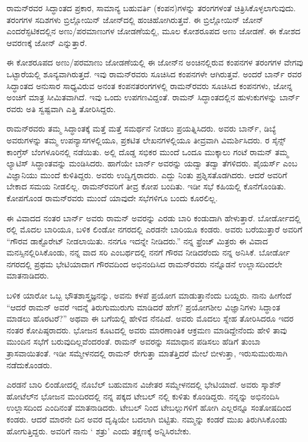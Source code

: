 ರಾಮನ್‍ರವರ ಸಿದ್ಧಾಂತದ ಪ್ರಕಾರ, ಸಾಮಾನ್ಯ ಬಹುವರ್ತಿ (ಕಂಪನ)ಗಳನ್ನು ತರಂಗ\-ಗಳಂತೆ ಚಿತ್ರಿಸಿಕೊಳ್ಳಲಾಗುವುದು. ತರಂಗಗಳ ಸದಿಶಗಳು ಬ್ರಿಲ್ಲೋಯಿನ್ ಜೋನ್‍ದಲ್ಲಿ ಹಂಚಿಹೋಗಿರುತ್ತವೆ. ಈ ಬ್ರಿಲ್ಲೋಯಿನ್ ಜೋನ್ ಎಂದರೆ\enginline{-}ಸ್ಫಟಿಕದಲ್ಲಿನ ಅಣು/ಪರಮಾಣುಗಳ ಜೋಡಣೆಯಲ್ಲಿ, ಮೂಲ ಕೋಶರೂಪದ ಅಣು ಜೋಡಣೆ. ಈ ಕೋಶದ ಆವರಣಕ್ಕೆ ಜೋನ್ ಎನ್ನುತ್ತಾರೆ.

ಈ ಕೋಶರೂಪದ ಅಣು/ಪರಮಾಣು ಜೋಡಣೆಯಲ್ಲಿ ಈ ಜೋನ್‌ನ ಅಂಚಿನಲ್ಲಿರುವ ಕಂಪನಗಳ ತರಂಗಗಳ ವೇಗವು ಒಟ್ಟಾರೆಯಲ್ಲಿ ಶೂನ್ಯವಾಗಿರುತ್ತದೆ. ಇವು ರಾಮನ್‍ರವರು ಸೂಚಿಸಿದ ಕಂಪನಗಳೇ ಆಗಿರುತ್ತವೆ. ಅಂದರೆ ಬಾರ್ನ್ ರವರ ಸಿದ್ಧಾಂತದ ಅನುಸಾರ ಸಾಧ್ಯವಿರುವ ಅನಂತ ಕಂಪನ\enginline{-}ತರಂಗಗಳಲ್ಲಿ ರಾಮನ್‍ರವರು ಸೂಚಿಸಿದ ಕಂಪನಗಳು, ಜೋನ್ನ ಅಂಚಿಗೆ ಮಾತ್ರ ಸೀಮಿತವಾಗಿದೆ. ಇವು ಒಂದು ಉಪಗಣವಿದ್ದಂತೆ. ರಾಮನ್ ಸಿದ್ಧಾಂತದಲ್ಲಿನ ಹುಳುಕುಗಳನ್ನು ಬಾರ್ನ್ ರವರು ಅತಿ ಸ್ವಷ್ಟವಾಗಿ ಎತ್ತಿ ತೋರಿಸಿದ್ದರು.

ರಾಮನ್‍ರವರು ತಮ್ಮ ಸಿದ್ಧಾಂತಕ್ಕೆ ಮತ್ತೆ ಮತ್ತೆ ಸಮರ್ಥನೆ ನೀಡಲು ಪ್ರಯತ್ನಿಸಿದರು. ಅವರು ಬಾರ್ನ್, ಡಿಬ್ಯೆ ಅವರುಗಳನ್ನು ತಮ್ಮ ಉಪನ್ಯಾಸಗಳಲ್ಲಿಯೂ, ಪ್ರಕಟಿತ ಲೇಖನಗಳಲ್ಲಿಯೂ ತೀವ್ರವಾಗಿ ವಿಮರ್ಶಿಸಿದರು. ರ ಸೈನ್ಸ್ ಕಾಂಗ್ರೆಸ್ ಬೆಂಗಳೂರಿನಲ್ಲಿ ನಡೆಯಿತು. ಅಲ್ಲಿ ದೊಡ್ಡ ಸಭಿಕರ ಮುಂದೆ ಒಂದೂ ಮುಕ್ಕಾಲು ಗಂಟೆ ರಾಮನ್ ತಮ್ಮ ಲ್ಯಾಟಿಸ್ ಸಿದ್ಧಾಂತವನ್ನು ಮಂಡಿಸಿದರು. ಹಾಗೆಯೇ ಬಾರ್ನ್ ಅವರನ್ನು ಯದ್ವಾ ತದ್ವಾ ತೆಗಳಿದರು. ಪೈಯರ್ಸ್ ಎಂಬ ವಿಜ್ಞಾನಿಯು ಮುಂದೆ ಕುಳಿತಿದ್ದರು. ಅವರು ಉದ್ವಿಗ್ನರಾದರು. ಎದ್ದು ನಿಂತು ಪ್ರಶ್ನಿಸತೊಡಗಿದರು. ಆದರೆ ಅವರಿಗೆ ಬೇಕಾದ ಸಮಯ ನೀಡಲಿಲ್ಲ. ರಾಮನ್‍ರವರಿಗೆ ತೀವ್ರ ಕೋಪ ಬಂದಿತು. ಇಡೀ ಸಭೆ ಕಹಿಯಲ್ಲಿ ಕೊನೆಗೊಂಡಿತು. ಕೋಪಗೊಂಡ ರಾಮನ್‍ರವರು ಮುಂದೆ ಯಾವುದೇ ಸಭೆಗಳಿಗೂ ಬಂದು ಕೂರಲಿಲ್ಲ.

ಈ ವಿವಾದದ ನಂತರ ಬಾರ್ನ್ ಅವರು ರಾಮನ್ ಅವರನ್ನು ಎರಡು ಬಾರಿ ಕಂಡುದಾಗಿ ಹೇಳುತ್ತಾರೆ. ಬೋರ್ಡೋದಲ್ಲಿ ರಲ್ಲಿ ಮೊದಲ ಬಾರಿಯೂ, ಬಳಿಕ ಲಿಂಡೋ ನಗರದಲ್ಲಿ ಎರಡನೇ ಬಾರಿಯೂ ಕಂಡರು. ಅವರು ಬರೆಯುತ್ತಾರೆ\enginline{--} ಅವರಿಗೆ “ಗೌರವ ಡಾಕ್ಟೊರೇಟ್ ನೀಡಲಾಯಿತು. ನನಗೂ ಇದನ್ನೇ ನೀಡಿದರು.” ನನ್ನ ಫ್ರೆಂಚ್ ಮಿತ್ರರು ಈ ವಿವಾದ ಮನಸ್ಸಿನಲ್ಲಿರಿಸಿಕೊಂಡು, ನನ್ನ ವಾದ ಸರಿ ಎಂಬರ್ಥದಲ್ಲಿ ನನಗೆ ಗೌರವ ನೀಡಿದರೆಂದು ನನ್ನ ಅನಿಸಿಕೆ. ಬೋರ್ಡೋ ನಗರದಲ್ಲಿ ಪ್ರಥಮ ಭೇಟಿಯಾದಾಗ ಗೌರವದಿಂದ ಅಭಿನಂದಿಸಿದ ರಾಮನ್‍ರವರು ನನ್ನೊಡನೆ ಉಲ್ಲಾಸದಿಂದಲೇ ಮಾತನಾಡಿದರು.

\newpage

ಬಳಿಕ ಯಾರೋ ಒಬ್ಬ ಭೌತಶಾಸ್ತ್ರಜ್ಞನನ್ನು, ಅವನು ಕಳಪೆ ಪ್ರಯೋಗ ಮಾಡುತ್ತಾನೆಂದು ಬಯ್ದರು. ನಾನು ಹೀಗೆಂದೆ \enginline{--} “ಆದರೆ ರಾಮನ್ ಅವರೆ ಇದನ್ನೆ ತಿರುಗುಮುರುಗು ಮಾಡಿದರೆ ಹೇಗೆ? ಪ್ರಯೋಗಶೀಲ ವಿಜ್ಞಾನಿಗಳು ಸಿದ್ಧಾಂತ ಮಾಡಲು ಹೊರಟರೆ?” ಅಥವಾ ಈ ಬಗೆಯಲ್ಲಿ ಹೇಳಿದ ನೆನಪಿದೆ. ಅವರು ಮೊದಲು ಸ್ನೇಹ ತೋರಿಸಿದರೂ ಇದರ ನಂತರ ಕೋಪಿಷ್ಠರಾದರು. ಭೋಜನ ಕೂಟದಲ್ಲಿ ಅವರು ಮಾರಣಾಂತಿಕ ಆಕ್ರಮಣ ಮಾಡಿದ್ದೇನೆಂದು ಹೇಳಿ ತಾವು ಮುಂದಿನ ಸಭೆಗೆ ಬರುವುದಿಲ್ಲವೆಂದರಂತೆ. ರಾಮನ್ ಅವರನ್ನು ಸಮಾಧಾನ ಪಡಿಸಲು ಹೆಡಿಗೆ ತುಂಬಾ ತ್ರಾಸವಾಯಿತಂತೆ. ಇಡೀ ಸಮ್ಮೇಳನದಲ್ಲಿ ರಾಮನ್ ರೇಗುತ್ತಾ ಮಾತೆತ್ತಿದರೆ ಮೇಲೆ ಬೀಳುತ್ತಾ, ಇರುಸುಮುರುಸಾಗಿ ನಡೆದುಕೊಂಡರು.

ಎರಡನೆ ಬಾರಿ ಲಿಂಡೋದಲ್ಲಿ ನೊಬೆಲ್ ಬಹುಮಾನ ವಿಜೇತರ ಸಮ್ಮೇಳನದಲ್ಲಿ ಭೇಟಿಯಾದೆ. ಅವರು ಸ್ಕಾಶೆನ್ ಹೋಟೆಲ್‍ನ ಭೋಜನ ಮಂದಿರದಲ್ಲಿ ನನ್ನ ಪಕ್ಕದ ಟೇಬಲ್ ನಲ್ಲಿ ಕುಳಿತು ಕೊಂಡಿದ್ದರು. ನನ್ನನ್ನು ಅಭಿನಂದಿಸಿ ಉಲ್ಲಾಸದಿಂದ ಎಂದಿನಂತೆ ಮಾತನಾಡಿದರು. ಟೇಬಲ್ ನಿಂದ ಟೇಬಲ್ಲುಗಳಿಗೆ ಹೋಗಿ ಎಲ್ಲರನ್ನೂ ಸಂತೋಷದಿಂದ ಕಂಡರು. ಆದರೆ ಮಾರನೇ ದಿನ ಅವರ ದೃಷ್ಠಿಯೇ ಬದಲಾಗಿ ಬಿಟ್ಟಿತು. ನಮ್ಮನ್ನು ಕಂಡರೆ ಮುಖ ತಿರುಗಿಸಿಕೊಂಡು ಹೋಗುತ್ತಿದ್ದರು. ಅವರಿಗೆ ನಾನು ‘ ಶತ್ರು’ ಎಂದು ತಕ್ಷಣಕ್ಕೆ ಅನ್ನಿಸಿರಬೇಕು.

